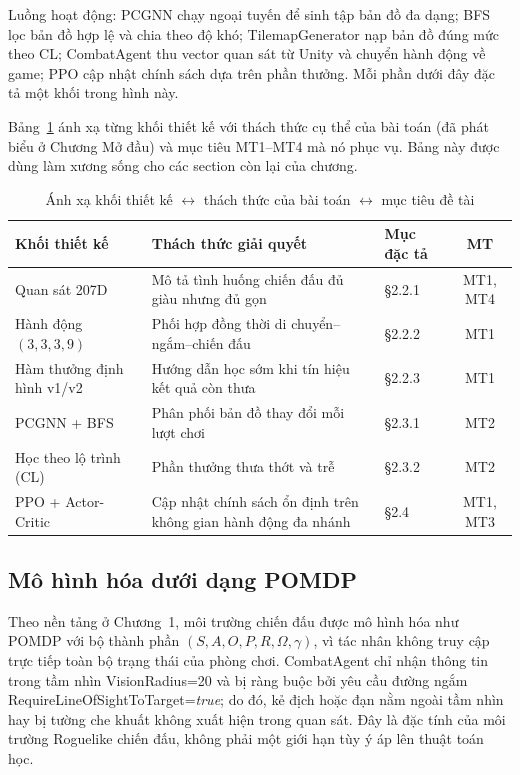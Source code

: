 Luồng hoạt động: PCGNN chạy ngoại tuyến để sinh tập bản đồ đa dạng; BFS lọc bản đồ hợp lệ và chia theo độ khó; TilemapGenerator nạp bản đồ đúng mức theo CL; CombatAgent thu vector quan sát từ Unity và chuyển hành động về game; PPO cập nhật chính sách dựa trên phần thưởng. Mỗi phần dưới đây đặc tả một khối trong hình này.

Bảng~\ref{tab:design_block_mapping} ánh xạ từng khối thiết kế với thách thức cụ thể của bài toán (đã phát biểu ở Chương Mở đầu) và mục tiêu MT1--MT4 mà nó phục vụ. Bảng này được dùng làm xương sống cho các section còn lại của chương.

\begin{table}[H]
    \centering
    \small
    \caption{Ánh xạ khối thiết kế $\leftrightarrow$ thách thức của bài toán $\leftrightarrow$ mục tiêu đề tài}
    \label{tab:design_block_mapping}
    \begin{tabular}{|p{3.4cm}|p{4.5cm}|p{3.5cm}|c|}
        \hline
        \textbf{Khối thiết kế} & \textbf{Thách thức giải quyết} & \textbf{Mục đặc tả} & \textbf{MT} \\
        \hline
        Quan sát 207D & Mô tả tình huống chiến đấu đủ giàu nhưng đủ gọn & §2.2.1 & MT1, MT4 \\
        \hline
        Hành động $(3,3,3,9)$ & Phối hợp đồng thời di chuyển--ngắm--chiến đấu & §2.2.2 & MT1 \\
        \hline
        Hàm thưởng định hình v1/v2 & Hướng dẫn học sớm khi tín hiệu kết quả còn thưa & §2.2.3 & MT1 \\
        \hline
        PCGNN + BFS & Phân phối bản đồ thay đổi mỗi lượt chơi & §2.3.1 & MT2 \\
        \hline
        Học theo lộ trình (CL) & Phần thưởng thưa thớt và trễ & §2.3.2 & MT2 \\
        \hline
        PPO + Actor-Critic & Cập nhật chính sách ổn định trên không gian hành động đa nhánh & §2.4 & MT1, MT3 \\
        \hline
    \end{tabular}
\end{table}

\subsection{Mô hình hóa dưới dạng POMDP}

Theo nền tảng ở Chương~1, môi trường chiến đấu được mô hình hóa như POMDP với bộ thành phần $(S, A, O, P, R, \Omega, \gamma)$, vì tác nhân không truy cập trực tiếp toàn bộ trạng thái của phòng chơi. CombatAgent chỉ nhận thông tin trong tầm nhìn VisionRadius=20 và bị ràng buộc bởi yêu cầu đường ngắm RequireLineOfSightToTarget=\textit{true}; do đó, kẻ địch hoặc đạn nằm ngoài tầm nhìn hay bị tường che khuất không xuất hiện trong quan sát. Đây là đặc tính của môi trường Roguelike chiến đấu, không phải một giới hạn tùy ý áp lên thuật toán học.


